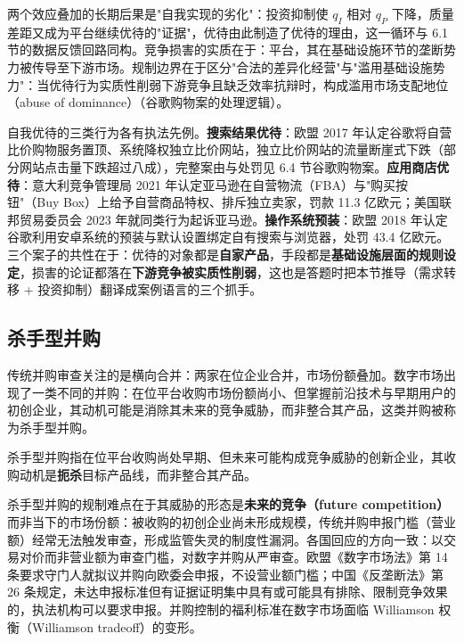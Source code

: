 两个效应叠加的长期后果是"自我实现的劣化"：投资抑制使 $q_I$ 相对 $q_P$ 下降，质量差距又成为平台继续优待的"证据"，优待由此制造了优待的理由，这一循环与 6.1 节的数据反馈回路同构。竞争损害的实质在于：平台，其在基础设施环节的垄断势力被传导至下游市场。规制边界在于区分"合法的差异化经营"与"滥用基础设施势力"：当优待行为实质性削弱下游竞争且缺乏效率抗辩时，构成滥用市场支配地位（abuse of dominance）（谷歌购物案的处理逻辑）。

自我优待的三类行为各有执法先例。\textbf{搜索结果优待}：欧盟 2017 年认定谷歌将自营比价购物服务置顶、系统降权独立比价网站，独立比价网站的流量断崖式下跌（部分网站点击量下跌超过八成），完整案由与处罚见 6.4 节谷歌购物案。\textbf{应用商店优待}：意大利竞争管理局 2021 年认定亚马逊在自营物流（FBA）与"购买按钮"（Buy Box）上给予自营商品特权、排斥独立卖家，罚款 11.3 亿欧元；美国联邦贸易委员会 2023 年就同类行为起诉亚马逊。\textbf{操作系统预装}：欧盟 2018 年认定谷歌利用安卓系统的预装与默认设置绑定自有搜索与浏览器，处罚 43.4 亿欧元。三个案子的共性在于：优待的对象都是\textbf{自家产品}，手段都是\textbf{基础设施层面的规则设定}，损害的论证都落在\textbf{下游竞争被实质性削弱}，这也是答题时把本节推导（需求转移 + 投资抑制）翻译成案例语言的三个抓手。

\subsection{杀手型并购}

传统并购审查关注的是横向合并：两家在位企业合并，市场份额叠加。数字市场出现了一类不同的并购：在位平台收购市场份额尚小、但掌握前沿技术与早期用户的初创企业，其动机可能是消除其未来的竞争威胁，而非整合其产品，这类并购被称为杀手型并购。

\begin{definition}
杀手型并购指在位平台收购尚处早期、但未来可能构成竞争威胁的创新企业，其收购动机是\textbf{扼杀}目标产品线，而非整合其产品。
\end{definition}

杀手型并购的规制难点在于其威胁的形态是\textbf{未来的竞争（future competition）}而非当下的市场份额：被收购的初创企业尚未形成规模，传统并购申报门槛（营业额）经常无法触发审查，形成监管失灵的制度性漏洞。各国回应的方向一致：以交易对价而非营业额为审查门槛，对数字并购从严审查。欧盟《数字市场法》第 14 条要求守门人就拟议并购向欧委会申报，不设营业额门槛；中国《反垄断法》第 26 条规定，未达申报标准但有证据证明集中具有或可能具有排除、限制竞争效果的，执法机构可以要求申报。并购控制的福利标准在数字市场面临 Williamson 权衡（Williamson tradeoff）的变形。


